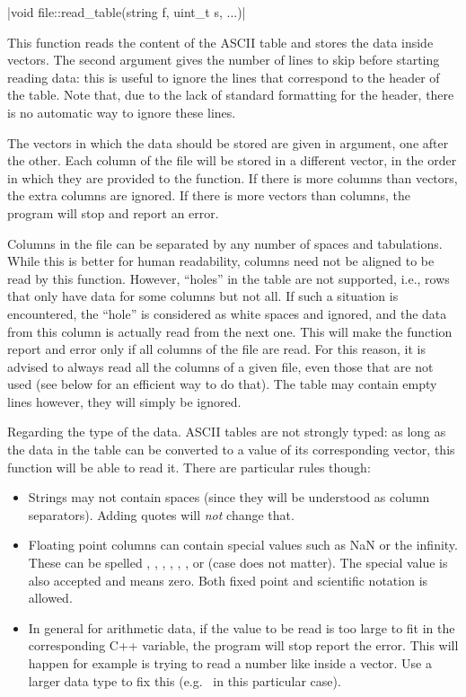 \item \cppinline|void file::read_table(string f, uint_t s, ...)| 

This function reads the content of the ASCII table  and stores the data inside vectors. The second argument  gives the number of lines to skip before starting reading data: this is useful to ignore the lines that correspond to the header of the table. Note that, due to the lack of standard formatting for the header, there is no automatic way to ignore these lines.

The vectors in which the data should be stored are given in argument, one after the other. Each column of the file will be stored in a different vector, in the order in which they are provided to the function. If there is more columns than vectors, the extra columns are ignored. If there is more vectors than columns, the program will stop and report an error.

Columns in the file can be separated by any number of spaces and tabulations. While this is better for human readability, columns need not be aligned to be read by this function. However, ``holes'' in the table are not supported, i.e., rows that only have data for some columns but not all. If such a situation is encountered, the ``hole'' is considered as white spaces and ignored, and the data from this column is actually read from the next one. This will make the function report and error only if all columns of the file are read. For this reason, it is advised to always read all the columns of a given file, even those that are not used (see below for an efficient way to do that). The table may contain empty lines however, they will simply be ignored.

Regarding the type of the data. ASCII tables are not strongly typed: as long as the data in the table can be converted to a value of its corresponding vector, this function will be able to read it. There are particular rules though:
\begin{itemize}
\item Strings may not contain spaces (since they will be understood as column separators). Adding quotes  will \emph{not} change that.
\item Floating point columns can contain special values such as NaN or the infinity. These can be spelled , , , , , ,  or  (case does not matter). The special value  is also accepted and means zero. Both fixed point and scientific notation is allowed.
\item In general for arithmetic data, if the value to be read is too large to fit in the corresponding C++ variable, the program will stop report the error. This will happen for example is trying to read a number like  inside a  vector. Use a larger data type to fix this (e.g.~ in this particular case).
\end{itemize}

